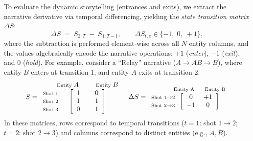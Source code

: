 \documentclass[sigconf,review,anonymous]{acmart}
\theoremstyle{definition}
\begin{document}
To evaluate the dynamic storytelling (entrances and exits), we extract the narrative derivative via temporal differencing, yielding the \emph{state transition matrix} $\Delta S$:
\begin{equation}
\Delta S \;=\; S_{2:T} \;-\; S_{1:T\!-\!1}, \qquad \Delta S_{t,e} \in \{-1,\; 0,\; +1\},
\label{eq:delta_s}
\end{equation}
where the subtraction is performed element-wise across all $N$ entity columns, and the values algebraically encode the narrative operations: $+1$ (\emph{enter}), $-1$ (\emph{exit}), and $0$ (\emph{hold}). For example, consider a ``Relay'' narrative ($A \!\to\! AB \!\to\! B$), where entity $B$ enters at transition 1, and entity $A$ exits at transition 2:
\begin{equation}
\label{eq:relay_example_annotated}
S = 
\begin{array}{cc}
  & \begin{matrix} \text{\scriptsize Entity } A & \hspace{1.5em} \text{\scriptsize Entity } B \end{matrix} \\
  \begin{matrix} \text{\scriptsize Shot 1} \\ \text{\scriptsize Shot 2} \\ \text{\scriptsize Shot 3} \end{matrix} \hspace{-12pt} & 
  \left[ \begin{array}{c@{\hspace{2.2em}}c} 1 & 0 \\ 1 & 1 \\ 0 & 1 \end{array} \right]
\end{array}
\quad
\Delta S = 
\begin{array}{cc}
  & \begin{matrix} \text{\scriptsize Entity A} & \hspace{0.5em} \text{\scriptsize Entity B} \end{matrix} \\
  \begin{matrix} \text{\scriptsize Shot 1$\to$2} \\ \text{\scriptsize Shot 2$\to$3} \end{matrix} \hspace{-12pt} & 
  \left[ \begin{array}{c@{\hspace{1.2em}}c} 0 & +1 \\ -1 & 0 \end{array} \right]
\end{array}
\end{equation}
In these matrices, rows correspond to temporal transitions ($t\!=\!1$: shot $1{\to}2$; $t\!=\!2$: shot $2{\to}3$) and columns correspond to distinct entities (e.g., $A, B$).
\end{document}
